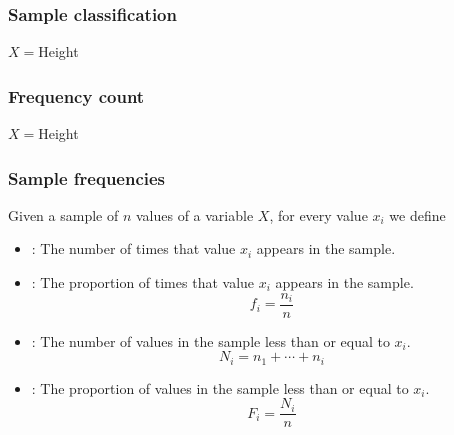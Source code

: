 \begin{frame}
\frametitle{Sample classification}
$X=$Height
\begin{center}
\scalebox{0.6}{}
\end{center}
\end{frame}


\begin{frame}
\frametitle{Frequency count}
$X=$Height
\begin{center}
\scalebox{0.6}{}
\end{center}
\end{frame}


\begin{frame}
\frametitle{Sample frequencies}
\begin{definition}
Given a sample of $n$ values of a variable $X$, for every value $x_i$ we define 
\begin{itemize}
\item {}: The number of times that value $x_i$ appears in the sample.
\item {}: The proportion of times that value $x_i$ appears in the sample.
\[
f_i = \frac{n_i}{n}
\]
\item {}: The number of values in the sample less than or equal to
$x_i$.
\[
N_i = n_1 + \cdots + n_i
\]
\item {}: The proportion of values in the sample less than or equal to
$x_i$.
\[
F_i = \frac{N_i}{n}
\]
\end{itemize}
\end{definition}
\end{frame}


